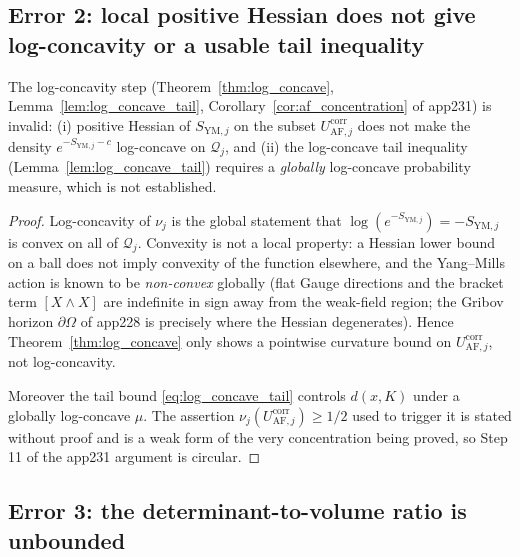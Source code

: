 \subsection{Error 2: local positive Hessian does not give log-concavity
or a usable tail inequality}

\begin{theorem}[Error 2]
\label{thm:app231_error2}
The log-concavity step (Theorem~\ref{thm:log_concave},
Lemma~\ref{lem:log_concave_tail}, Corollary~\ref{cor:af_concentration}
of app231) is invalid: (i) positive Hessian of $S_{\mathrm{YM},j}$ on
the subset $U_{\mathrm{AF},j}^{\mathrm{corr}}$ does not make the density
$e^{-S_{\mathrm{YM},j}-c}$ log-concave on $\mathcal{Q}_{j}$, and (ii)
the log-concave tail inequality
(Lemma~\ref{lem:log_concave_tail}) requires a \emph{globally}
log-concave probability measure, which is not established.
\end{theorem}

\begin{proof}
Log-concavity of $\nu_{j}$ is the global statement that
$\log(e^{-S_{\mathrm{YM},j}})=-S_{\mathrm{YM},j}$ is convex on all of
$\mathcal{Q}_{j}$. Convexity is not a local property: a Hessian lower
bound on a ball does not imply convexity of the function elsewhere, and
the Yang--Mills action is known to be \emph{non-convex} globally (flat
Gauge directions and the bracket term $[X\wedge X]$ are indefinite in
sign away from the weak-field region; the Gribov horizon
$\partial\Omega$ of app228 is precisely where the Hessian degenerates).
Hence Theorem~\ref{thm:log_concave} only shows a pointwise curvature
bound on $U_{\mathrm{AF},j}^{\mathrm{corr}}$, not log-concavity.

Moreover the tail bound \eqref{eq:log_concave_tail} controls
$d(x,K)$ under a globally log-concave $\mu$. The assertion
$\nu_{j}(U_{\mathrm{AF},j}^{\mathrm{corr}})\ge 1/2$ used to trigger it is
stated without proof and is a weak form of the very concentration being
proved, so Step 11 of the app231 argument is circular.
\end{proof}

\subsection{Error 3: the determinant-to-volume ratio is unbounded}

